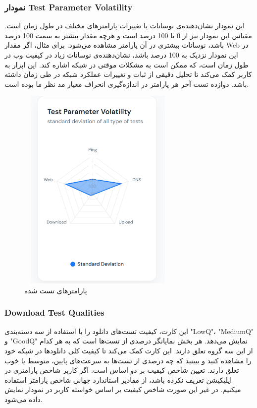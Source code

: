 \documentclass{report}
\begin{document}
\subsubsection{نمودار Test Parameter Volatility}
این نمودار نشان‌دهنده‌ی نوسانات یا تغییرات پارامترهای مختلف در طول زمان است. مقیاس این نمودار نیز از 0 تا 100 درصد است و هرچه مقدار بیشتر به سمت 100 درصد باشد، نوسانات بیشتری در آن پارامتر مشاهده می‌شود. برای مثال، اگر مقدار Web در این نمودار نزدیک به 100 درصد باشد، نشان‌دهنده‌ی نوسانات زیاد در کیفیت وب در طول زمان است، که ممکن است به مشکلات موقتی در شبکه اشاره کند. این ابزار به کاربر کمک می‌کند تا تحلیل دقیقی از ثبات و تغییرات عملکرد شبکه در طی زمان داشته باشد. دوازده تست آخر هر پارامتر در اندازه‌گیری انحراف معیار مد نظر ما بوده است.
 \begin{figure}[h]
	\centering
	\includegraphics[width=0.7\textwidth,height=10cm,keepaspectratio]{Pic/param}
	\caption{پارامترهای تست شده}
	\label{fig:parameter}
\end{figure}
\subsubsection{Download Test Qualities}
این کارت، کیفیت تست‌های دانلود را با استفاده از سه دسته‌بندی "LowQ"، "MediumQ" و "GoodQ" نمایش می‌دهد. هر بخش نمایانگر درصدی از تست‌ها است که به هر کدام از این سه گروه تعلق دارند. این کارت کمک می‌کند تا کیفیت کلی دانلودها در شبکه خود را مشاهده کنید و ببینید که چه درصدی از تست‌ها به سرعت‌های پایین، متوسط یا خوب تعلق دارند. تعیین شاخص کیفیت بر دو اساس است. اگر کاربر شاخص پارامتری در اپلیکیشن تعریف نکرده باشد، از مقادیر استاندارد جهانی شاخص پارامتر استفاده میکنیم. در غیر این صورت شاخص کیفیت بر اساس خواسته کاربر در نمودار نمایش داده می‌شود.
\end{document}
